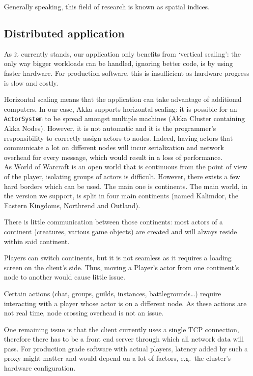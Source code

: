 \documentclass[paper=a4, fontsize=11pt]{scrartcl}
\begin{document}
Generally speaking, this field of research is known as spatial indices.

\subsection{Distributed application}\label{distr}

As it currently stands, our application only benefits from `vertical scaling':
the only way bigger workloads can be handled, ignoring better code, is by using
faster hardware.
For production software, this is insufficient as hardware progress is slow
and costly.

Horizontal scaling means that the application can take advantage of additional
computers.
In our case, Akka supports horizontal scaling: it is possible for an
\texttt{ActorSystem} to be spread amongst multiple machines (Akka Cluster
containing Akka Nodes).
However, it is not automatic and it is the programmer's responsibility to
correctly assign actors to nodes.
Indeed, having actors that communicate a lot on different nodes will incur
serialization and network overhead for every message, which would result in a
loss of performance.\\

As World of Warcraft is an open world that is continuous from the point of view
of the player, isolating groups of actors is difficult.
However, there exists a few hard borders which can be used.
The main one is continents. The main world, in the version we support, is split
in four main continents (named Kalimdor, the Eastern Kingdoms, Northrend and
Outland).

There is little communication between those continents: most actors of a
continent (creatures, various game objects) are created and will always reside
within said continent.

Players can switch continents, but it is not seamless as it requires a loading
screen on the client's side.
Thus, moving a Player's actor from one continent's node to another would
cause little issue.

Certain actions (chat, groups, guilds, instances, battlegrounds\ldots) 
require interacting with a player whose actor is on a different node.
As these actions are not real time, node crossing overhead is not an issue.

One remaining issue is that the client currently uses a single TCP connection,
therefore there has to be a front end server through which all network data
will pass.
For production grade software with actual players, latency added by such a proxy
might matter and would depend on a lot of factors, e.g.\ the cluster's hardware
configuration.
\end{document}
